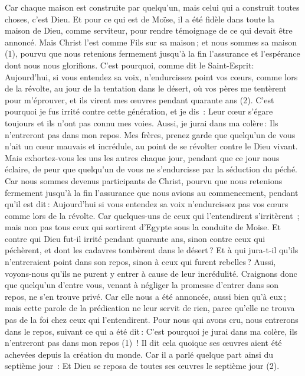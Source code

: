 \begin{multicols}{2}
Car chaque maison est construite par quelqu'un, mais celui qui a construit toutes choses, c'est Dieu.
Et pour ce qui est de Moïse, il a été fidèle dans toute la maison de Dieu, comme serviteur, pour rendre témoignage de ce qui devait être annoncé.
Mais Christ l’est comme Fils sur sa maison ; et nous sommes sa maison (1), pourvu que nous retenions fermement jusqu’à la fin l'assurance et l'espérance dont nous nous glorifions.
C'est pourquoi, comme dit le Saint-Esprit: Aujourd'hui, si vous entendez sa voix,
n'endurcissez point vos cœurs, comme lors de la révolte, au jour de la tentation dans le désert,
où vos pères me tentèrent pour m’éprouver, et ils virent mes œuvres pendant quarante ans (2).
C'est pourquoi je fus irrité contre cette génération, et je dis : Leur cœur s'égare toujours et ils n'ont pas connu mes voies.
Aussi, je jurai dans ma colère : Ils n’entreront pas dans mon repos.
Mes frères, prenez garde que quelqu'un de vous n’ait un cœur mauvais et incrédule, au point de se révolter contre le Dieu vivant.
Mais exhortez-vous les uns les autres chaque jour, pendant que ce jour nous éclaire, de peur que quelqu'un de vous ne s'endurcisse par la séduction du péché.
Car nous sommes devenus participants de Christ, pourvu que nous retenions fermement jusqu'à la fin l’assurance que nous avions au commencement,
pendant qu'il est dit : Aujourd'hui si vous entendez sa voix n'endurcissez pas vos cœurs comme lors de la révolte.
Car quelques-uns de ceux qui l’entendirent s’irritèrent ; mais non pas tous ceux qui sortirent d’Egypte sous la conduite de Moïse.
Et contre qui Dieu fut-il irrité pendant quarante ans, sinon contre ceux qui péchèrent, et dont les cadavres tombèrent dans le désert ?
Et à qui jura-t-il qu'ils n'entreraient point dans son repos, sinon à ceux qui furent rebelles ?
Aussi, voyons-nous qu'ils ne purent y entrer à cause de leur incrédulité.
\VerseOne{}Craignons donc que quelqu'un d'entre vous, venant à négliger la promesse d'entrer dans son repos, ne s'en trouve privé.
Car elle nous a été annoncée, aussi bien qu’à eux ; mais cette parole de la prédication ne leur servit de rien, parce qu'elle ne trouva pas de la foi chez ceux qui l’entendirent.
Pour nous qui avons cru, nous entrerons dans le repos, suivant ce qui a été dit : C'est pourquoi je jurai dans ma colère, ils n’entreront pas dans mon repos (1) ! Il dit cela quoique ses œuvres aient été achevées depuis la création du monde.
Car il a parlé quelque part ainsi du septième jour : Et Dieu se reposa de toutes ses œuvres le septième jour (2).

\end{multicols}

